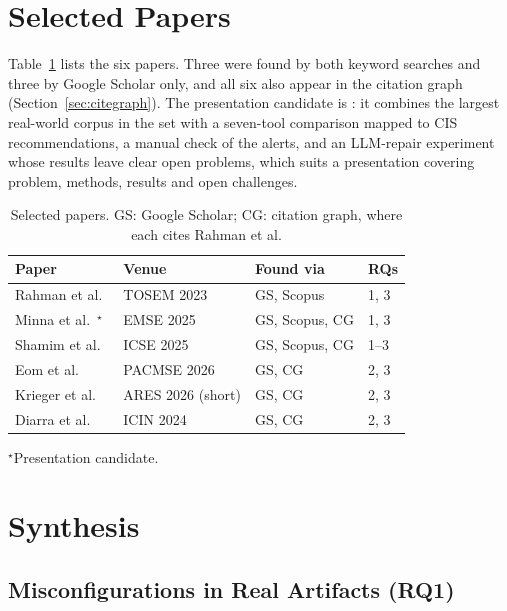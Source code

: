 \documentclass[sigconf,nonacm]{acmart}
\begin{document}
\section{Selected Papers}
\label{sec:selected}

Table~\ref{tab:papers} lists the six papers. Three were found by both keyword searches and three by Google Scholar only, and all six also appear in the citation graph (Section~\ref{sec:citegraph}). The presentation candidate is \citet{minna2025}: it combines the largest real-world corpus in the set with a seven-tool comparison mapped to CIS recommendations, a manual check of the alerts, and an LLM-repair experiment whose results leave clear open problems, which suits a presentation covering problem, methods, results and open challenges.

\begin{table}[t]
  \caption{Selected papers. GS: Google Scholar; CG: citation graph, where each cites Rahman et al.}
  \label{tab:papers}
  \small
  \begin{tabular}{@{}llll@{}}
    \toprule
    Paper & Venue & Found via & RQs \\
    \midrule
    Rahman et al.~\cite{rahman2023} & TOSEM 2023 & GS, Scopus & 1, 3 \\
    Minna et al.~\cite{minna2025}$^{\star}$ & EMSE 2025 & GS, Scopus, CG & 1, 3 \\
    Shamim et al.~\cite{shamim2025} & ICSE 2025 & GS, Scopus, CG & 1--3 \\
    Eom et al.~\cite{eom2026} & PACMSE 2026 & GS, CG & 2, 3 \\
    Krieger et al.~\cite{krieger2026} & ARES 2026 (short) & GS, CG & 2, 3 \\
    Diarra et al.~\cite{diarra2024} & ICIN 2024 & GS, CG & 2, 3 \\
    \bottomrule
  \end{tabular}

  \smallskip
  \footnotesize $^{\star}$Presentation candidate.
\end{table}

\section{Synthesis}

\subsection{Misconfigurations in Real Artifacts (RQ1)}
\end{document}
